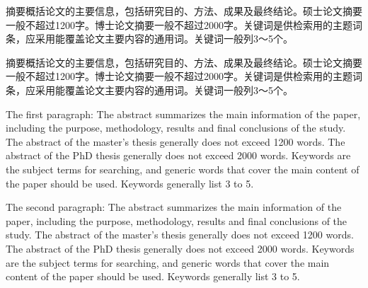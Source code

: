 \begin{abszh}
    摘要概括论文的主要信息，包括研究目的、方法、成果及最终结论。硕士论文摘要一般不超过1200字。博士论文摘要一般不超过2000字。关键词是供检索用的主题词条，应采用能覆盖论文主要内容的通用词。关键词一般列3～5个。

    摘要概括论文的主要信息，包括研究目的、方法、成果及最终结论。硕士论文摘要一般不超过1200字。博士论文摘要一般不超过2000字。关键词是供检索用的主题词条，应采用能覆盖论文主要内容的通用词。关键词一般列3～5个。
\end{abszh}

\begin{absen}
    The first paragraph: The abstract summarizes the main information of the paper, including the purpose, methodology, results and final conclusions of the study. The abstract of the master's thesis generally does not exceed 1200 words. The abstract of the PhD thesis generally does not exceed 2000 words. Keywords are the subject terms for searching, and generic words that cover the main content of the paper should be used. Keywords generally list 3 to 5.
    
    The second paragraph: The abstract summarizes the main information of the paper, including the purpose, methodology, results and final conclusions of the study. The abstract of the master's thesis generally does not exceed 1200 words. The abstract of the PhD thesis generally does not exceed 2000 words. Keywords are the subject terms for searching, and generic words that cover the main content of the paper should be used. Keywords generally list 3 to 5.
\end{absen}